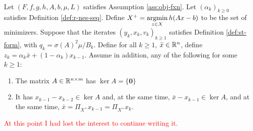 \documentclass[12pt]{article}
\begin{document}
        \begin{assumption}\;\label{ass:cond-lin-cnvg}\\
            Let $(F, f, g, h, A, b, \mu, L)$ satisfies Assumption \ref{ass:obj-fxn}. 
            Let $(\alpha_k)_{k\ge 0}$ satisfies Definition \ref{def:r-nes-seq}. 
            Define $X^+ = \mathop{\rm argmin}\limits_{z \in X} h(Ax - b)$ to be the set of minimizers. 
            Suppose that the iterates $(y_k, x_k, v_k)_{k \ge 1}$ satisfies Definition \ref{def:st-form}, with $q_k = \sigma(A)^2\mu/B_k$. 
            Define for all $k \ge 1$,  $\bar x \in \mathbb R^n$, define $z_k = \alpha_k \bar x + (1 - \alpha_k)x_{k - 1}$. 
            Assume in addition, any of the following for some $k \ge 1$:  
            \begin{enumerate}
                \item The matrix $A \in\mathbb R^{n\times m}$ has $\ker A = \{\mathbf 0\}$
                \item It has $x_{k - 1} - x_{k - 2} \in \ker A$ and, at the same time, $\bar x - x_{k - 1} \in \ker A$, and at the same time, $\bar x = \Pi_{X^+} x_{k - 1} = \Pi_{X^+} x_k$. 
            \end{enumerate}            
        \end{assumption}
        \textcolor{red}{At this point I had lost the interest to continue writing it. }






\end{document}
